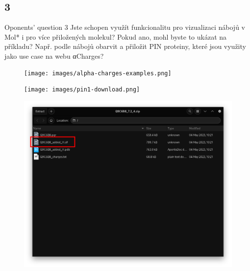 \documentclass[
]{beamer}
\begin{document}
\subsection[3]{3}

\begin{frame}
  \begin{block}{Oponents' question 3}
    Jste schopen využít funkcionalitu pro vizualizaci nábojů v Mol* i pro více přiložených molekul? Pokud ano, mohl byste to ukázat na příkladu? Např. podle nábojů obarvit a přiložit PIN proteiny, které jsou využity jako use case na webu αCharges?
  \end{block}
\end{frame}

\begin{frame}
  \begin{figure}
    \texttt{[image: images/alpha-charges-examples.png]}
  \end{figure}
\end{frame}

\begin{frame}
  \begin{figure}
    \texttt{[image: images/pin1-download.png]}
  \end{figure}
\end{frame}

\begin{frame}
  \begin{figure}
    \includegraphics[width=1\textwidth,height=\textheight,keepaspectratio]{images/folder.png}
  \end{figure}
\end{frame}
\end{document}
